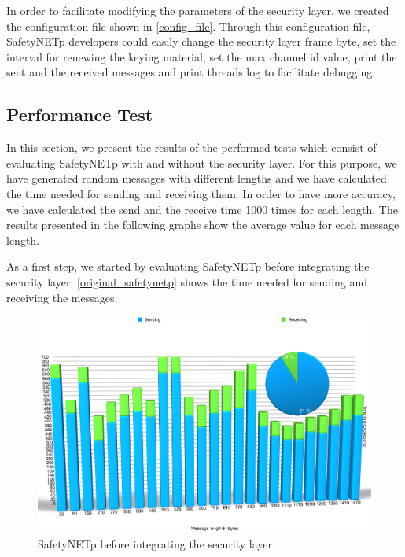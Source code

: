 In order to facilitate modifying the parameters of the security layer, we created the configuration file
shown in \autoref{config_file}. Through this configuration file, SafetyNETp developers could easily change the security layer frame
byte, set the interval for renewing the keying material, set the max channel id value, print the sent and the received messages and print threads log to facilitate
debugging.

\newpage





\subsection{Performance Test}

In this section, we present the results of the performed tests which consist of evaluating SafetyNETp with and
without the security layer. For this purpose, we have generated random messages with different lengths and we have calculated the time needed for sending and receiving them. In order to have more accuracy,
we have calculated the send and the receive time  1000 times for each length. The results presented in
the following graphs show the average value for each message length.

As a first step, we started by evaluating SafetyNETp before integrating the security layer.
\autoref{original_safetynetp} shows the time needed for sending and receiving the messages.

\begin{figure}[H]
\centering
\includegraphics[width=19cm,frame]{figures/realization/original_safetynetp.jpg}
\caption{SafetyNETp before integrating the security layer}\label{original_safetynetp}
\end{figure}


